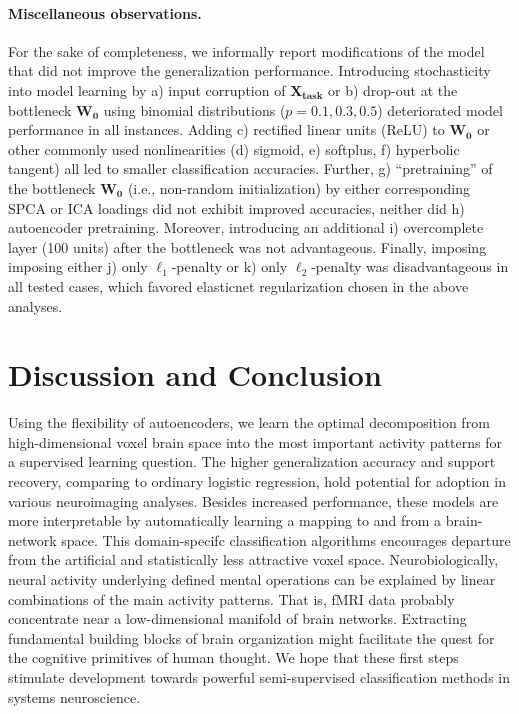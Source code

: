\documentclass{article} %
\begin{document}
\paragraph{Miscellaneous observations.}
For the sake of completeness,
we informally report modifications of the model
that did not improve the generalization performance.
%
Introducing stochasticity into model learning by 
a) input corruption of $\mathbf{X_{task}}$ or
b) drop-out at the bottleneck $\mathbf{W_0}$ using binomial
distributions ($p=0.1, 0.3, 0.5$) deteriorated model performance
in all instances. 
%
Adding c) rectified linear units (ReLU) to $\mathbf{W_0}$ or
other commonly used nonlinearities (d) sigmoid, e) softplus,
f) hyperbolic tangent) all led to smaller classification accuracies.
%
Further, g) ``pretraining'' of the bottleneck $\mathbf{W_0}$
(i.e., non-random initialization) by 
either corresponding SPCA or ICA loadings did not exhibit improved accuracies,
neither did h) autoencoder pretraining.
%
Moreover,
introducing an additional i) overcomplete layer (100 units)
after the bottleneck was not advantageous.
%
Finally, imposing imposing either j) only $\ell_1$-penalty or 
k) only $\ell_2$-penalty was disadvantageous in all tested cases,
which favored elasticnet regularization chosen in the above analyses.

\section{Discussion and Conclusion}
Using the flexibility of autoencoders, we
learn the optimal decomposition from high-dimensional
voxel brain space into the most important activity patterns for a
supervised learning question.
The higher generalization accuracy and support recovery, comparing to
ordinary logistic regression, hold potential
for adoption in various neuroimaging analyses.
Besides increased performance, these models are more interpretable by
automatically learning a mapping to and from a brain-network space.
This domain-specifc classification algorithms
encourages departure from the artificial and statistically
less attractive voxel space.
Neurobiologically,
neural activity underlying defined mental operations
can be explained by linear combinations of the main activity
patterns. That is,
fMRI data probably concentrate near
a low-dimensional manifold of brain networks.
Extracting fundamental building blocks of brain organization might
facilitate the quest for the cognitive primitives of
human thought.
We hope that these first steps stimulate development towards
powerful semi-supervised classification methods in systems neuroscience.
\end{document}
